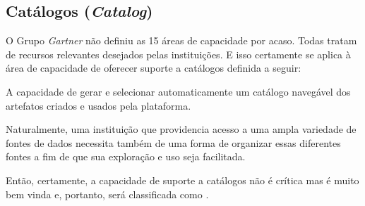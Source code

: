 \subsection{Catálogos (\emph{Catalog})}
\label{sub-catalog}

O Grupo \emph{Gartner} não definiu as 15 áreas de capacidade por acaso. Todas tratam de recursos relevantes desejados pelas instituições. E isso certamente se aplica à área de capacidade de oferecer suporte a catálogos definida a seguir:

\begin{definition}
A capacidade de gerar e selecionar automaticamente um catálogo navegável dos artefatos criados e usados pela plataforma.
\end{definition}

Naturalmente, uma instituição que providencia acesso a uma ampla variedade de fontes de dados necessita também de uma forma de organizar essas diferentes fontes a fim de que sua exploração e uso seja facilitada.

Então, certamente, a capacidade de suporte a catálogos não é crítica mas é muito bem vinda e, portanto, será classificada como  \SHOULD.
